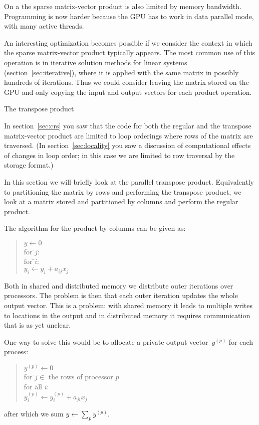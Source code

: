 On a  the sparse matrix-vector product is also limited by
memory bandwidth. Programming is now harder because the \ac{GPU} has
to work in data parallel mode, with many active threads. 

An
interesting optimization becomes possible if we consider the context
in which the sparse matrix-vector product typically appears. The most
common use of this operation is in iterative solution methods for
linear systems (section~\ref{sec:iterative}), where it is applied with
the same matrix in possibly hundreds of iterations. Thus we could
consider leaving the matrix stored on the GPU and only copying the
input and output vectors for each product operation.

 {The transpose product}
\label{sec:shared-crs-transpose}

In section~\ref{sec:crs} you saw that the code for both the regular
and the transpose matrix-vector product are limited to loop orderings
where rows of the matrix are traversed. (In section~\ref{sec:locality}
you saw a discussion of computational effects of changes in loop
order; in this case we are limited to row traversal by the storage
format.) 

In this section we will briefly look at the parallel transpose
product. Equivalently to partitioning the matrix by rows and
performing the transpose product, we look at a matrix stored and
partitioned by columns and perform the regular product.

The  algorithm for the product by columns can be given as:
\begin{quote}
    \begin{tabbing}
      $y\leftarrow 0$\\
      for \=$j$:\\
      \> for \=$i$:\\
      \>\> $y_i\leftarrow y_i+a_{ij}x_j$
    \end{tabbing}
\end{quote}
Both in shared and distributed memory we distribute outer iterations
over processors. The problem is then that each outer iteration updates
the whole output vector. This is a problem: with shared memory it
leads to multiple writes to locations in the output and in distributed
memory it requires communication that is as yet unclear.

One way to solve this would be to allocate a private output
vector~$y^{(p)}$ for each process:
\begin{quote}
    \begin{tabbing}
      $y^{(p)}\leftarrow 0$\\
      for \=$j\in$ the rows of processor $p$\\
      \> for \=all $i$:\\
      \>\> $y^{(p)}_i\leftarrow y^{(p)}_i+a_{ji}x_j$
    \end{tabbing}
\end{quote}
after which we sum $y\leftarrow\sum_py^{(p)}$.

